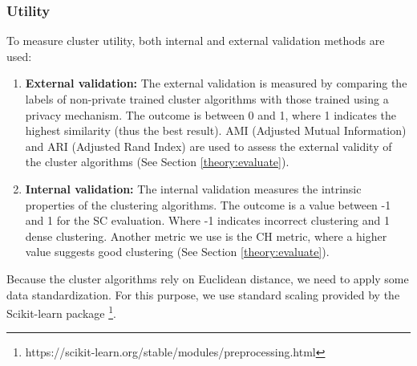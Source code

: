 \subsubsection*{Utility}
To measure cluster utility, both internal and external validation methods are used:
{}
\begin{enumerate}
  \item \textbf{External validation: }
        The external validation is measured by comparing the labels of non-private trained cluster algorithms with those trained using a privacy mechanism.
        The outcome is between 0 and 1, where 1 indicates the highest similarity (thus the best result).
        AMI (Adjusted Mutual Information) and ARI (Adjusted Rand Index) are used to assess the external validity of the cluster algorithms (See Section \ref{theory:evaluate}).
  \item \textbf{Internal validation: }
        The internal validation measures the intrinsic properties of the clustering algorithms.
        The outcome is a value between -1 and 1 for the SC evaluation.
        Where -1 indicates incorrect clustering and 1 dense clustering.
        Another metric we use is the CH metric, where a higher value suggests good clustering (See Section \ref{theory:evaluate}).
\end{enumerate}
Because the cluster algorithms rely on Euclidean distance, we need to apply some data standardization.
For this purpose, we use standard scaling provided by the Scikit-learn package \footnote{https://scikit-learn.org/stable/modules/preprocessing.html}.

